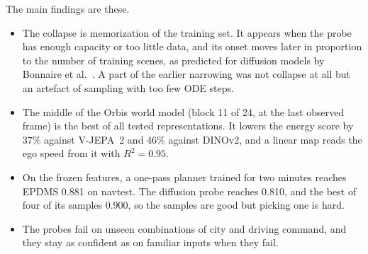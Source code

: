 The main findings are these.
\begin{itemize}[leftmargin=*,itemsep=2pt]
  \item The collapse is memorization of the training set. It appears when the
  probe has enough capacity or too little data, and its onset moves later in
  proportion to the number of training scenes, as predicted for diffusion models
  by Bonnaire et al.~\cite{bonnaire}. A part of the earlier narrowing was not
  collapse at all but an artefact of sampling with too few ODE steps.
  \item The middle of the Orbis world model (block 11 of 24, at the last observed
  frame) is the best of all tested representations. It lowers the energy score by
  37\% against V-JEPA~2 and 46\% against DINOv2, and a linear map reads the ego
  speed from it with $R^2=0.95$.
  \item On the frozen features, a one-pass planner trained for two minutes reaches
  EPDMS 0.881 on navtest. The diffusion probe reaches 0.810, and the best of four
  of its samples 0.900, so the samples are good but picking one is hard.
  \item The probes fail on unseen combinations of city and driving command, and
  they stay as confident as on familiar inputs when they fail.
\end{itemize}
